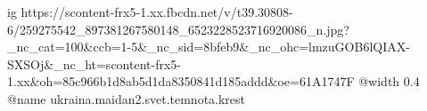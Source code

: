  
 
 
 
 

\ifcmt
  ig https://scontent-frx5-1.xx.fbcdn.net/v/t39.30808-6/259275542_897381267580148_6523228523716920086_n.jpg?_nc_cat=100&ccb=1-5&_nc_sid=8bfeb9&_nc_ohc=lmzuGOB6lQIAX-SXSOj&_nc_ht=scontent-frx5-1.xx&oh=85c966b1d8ab5d1da8350841d185addd&oe=61A1747F
  @width 0.4
	@name ukraina.maidan2.svet.temnota.krest
\fi
